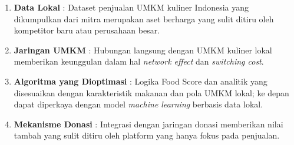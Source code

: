 \begin{enumerate}[leftmargin=*]
    \item \textbf{Data Lokal} : Dataset penjualan UMKM kuliner Indonesia yang dikumpulkan dari mitra merupakan aset berharga yang sulit ditiru oleh kompetitor baru atau perusahaan besar.
    
    \item \textbf{Jaringan UMKM} : Hubungan langsung dengan UMKM kuliner lokal memberikan keunggulan dalam hal \textit{network effect} dan \textit{switching cost}.
    
    \item \textbf{Algoritma yang Dioptimasi} : Logika Food Score dan analitik yang disesuaikan dengan karakteristik makanan dan pola UMKM lokal; ke depan dapat diperkaya dengan model \textit{machine learning} berbasis data lokal.
    
    \item \textbf{Mekanisme Donasi} : Integrasi dengan jaringan donasi memberikan nilai tambah yang sulit ditiru oleh platform yang hanya fokus pada penjualan.
\end{enumerate}
